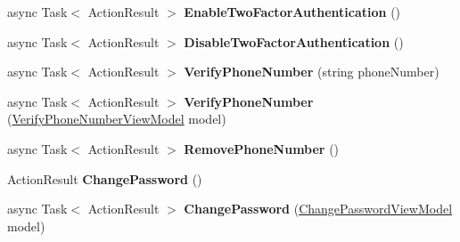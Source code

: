 \begin{DoxyCompactItemize}
\item 
async Task$<$ Action\+Result $>$ {\bfseries Enable\+Two\+Factor\+Authentication} ()\hypertarget{class_cloud_bread_admin_web_1_1_controllers_1_1_manage_controller_aefe8d4cf6fff8907beba2fa2bd2d6dc3}{}\label{class_cloud_bread_admin_web_1_1_controllers_1_1_manage_controller_aefe8d4cf6fff8907beba2fa2bd2d6dc3}

\item 
async Task$<$ Action\+Result $>$ {\bfseries Disable\+Two\+Factor\+Authentication} ()\hypertarget{class_cloud_bread_admin_web_1_1_controllers_1_1_manage_controller_a2b689354ee7111fb446a910c6df4af9b}{}\label{class_cloud_bread_admin_web_1_1_controllers_1_1_manage_controller_a2b689354ee7111fb446a910c6df4af9b}

\item 
async Task$<$ Action\+Result $>$ {\bfseries Verify\+Phone\+Number} (string phone\+Number)\hypertarget{class_cloud_bread_admin_web_1_1_controllers_1_1_manage_controller_ad9e07cbf467f6502de0a78cabc2eaed1}{}\label{class_cloud_bread_admin_web_1_1_controllers_1_1_manage_controller_ad9e07cbf467f6502de0a78cabc2eaed1}

\item 
async Task$<$ Action\+Result $>$ {\bfseries Verify\+Phone\+Number} (\hyperlink{class_cloud_bread_admin_web_1_1_models_1_1_verify_phone_number_view_model}{Verify\+Phone\+Number\+View\+Model} model)\hypertarget{class_cloud_bread_admin_web_1_1_controllers_1_1_manage_controller_aeb749a4cccce0da0fa207a62357a5e55}{}\label{class_cloud_bread_admin_web_1_1_controllers_1_1_manage_controller_aeb749a4cccce0da0fa207a62357a5e55}

\item 
async Task$<$ Action\+Result $>$ {\bfseries Remove\+Phone\+Number} ()\hypertarget{class_cloud_bread_admin_web_1_1_controllers_1_1_manage_controller_ad7f9a4017abac903dcf9560ce78e19cc}{}\label{class_cloud_bread_admin_web_1_1_controllers_1_1_manage_controller_ad7f9a4017abac903dcf9560ce78e19cc}

\item 
Action\+Result {\bfseries Change\+Password} ()\hypertarget{class_cloud_bread_admin_web_1_1_controllers_1_1_manage_controller_ade56c10015083413bdef6ffd2ad81338}{}\label{class_cloud_bread_admin_web_1_1_controllers_1_1_manage_controller_ade56c10015083413bdef6ffd2ad81338}

\item 
async Task$<$ Action\+Result $>$ {\bfseries Change\+Password} (\hyperlink{class_cloud_bread_admin_web_1_1_models_1_1_change_password_view_model}{Change\+Password\+View\+Model} model)\hypertarget{class_cloud_bread_admin_web_1_1_controllers_1_1_manage_controller_ab58811021906eb6c625076add84df445}{}\label{class_cloud_bread_admin_web_1_1_controllers_1_1_manage_controller_ab58811021906eb6c625076add84df445}


\end{DoxyCompactItemize}
